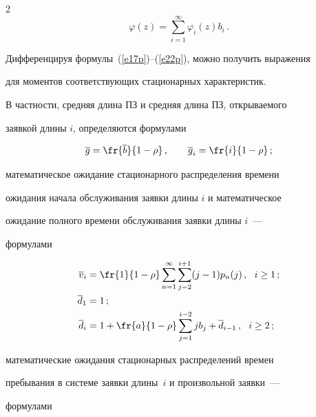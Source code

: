 \begin{multicols}{2}
\begin{equation}
\varphi(z)      = \sum_{i=1}^\infty


\varphi_i(z) b_i\,.


\label{e22p}


\end{equation}





Дифференцируя формулы~(\ref{e17p})--(\ref{e22p}), можно получить выражения


для моментов соответствующих стационарных характеристик.


В частности, средняя длина ПЗ и средняя длина ПЗ, открываемого


заявкой длины $i$, определяются формулами


$$


\overline g = \fr {\overline b }{ 1-\rho}\,,


\qquad \overline g_i = \fr{i }{ 1-\rho}\,;


$$


математическое ожидание стационарного распределения времени


ожидания начала обслуживания заявки длины $i$ и математическое


ожидание полного времени обслуживания заявки длины $i$~---


формулами


\begin{align*}


\overline v_i & = \fr{1}{1-\rho}


\sum_{n=1}^\infty \sum_{j=2}^{i+1} (j-1) p_n(j)\,,


\ \ i\ge 1\,;\\


\overline d_1 & = 1\,;\\


\overline d_i & = 1 +  \fr{a}{1-\rho}


\sum_{j=1}^{i-2} j b_j + \overline d_{i-1}\,,


\ \ i\ge 2\,;


\end{align*}


математические ожидания стационарных распределений времен


пребывания в системе заявки длины~$i$ и произвольной заявки~---


формулами





\noindent


\begin{align*}



\end{align*}
\end{multicols}
